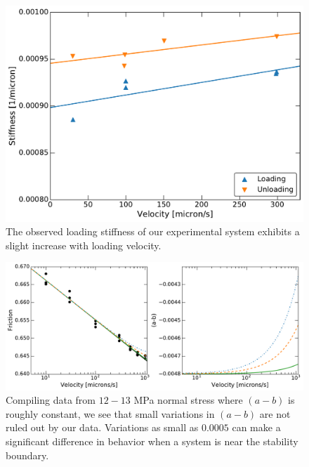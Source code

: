 \begin{figure}[H]
	\centering
		\includegraphics[scale=0.6]{chap_slow_slip_details/Figure_12.pdf}
   	\caption{The observed loading stiffness of our experimental system exhibits a slight increase with loading velocity.}
  	\label{Figure_12}
\end{figure}

\clearpage

\begin{figure}[H]
	\centering
		\includegraphics[scale=0.45]{chap_slow_slip_details/Figure_13.pdf}
   	\caption{Compiling data from $12-13$ MPa normal stress where $(a-b)$ is roughly constant, we see that small variations in $(a-b)$ are not ruled out by our data. Variations as small as $0.0005$ can make a significant difference in behavior when a system is near the stability boundary.}
  	\label{Figure_13}
\end{figure}

\clearpage

